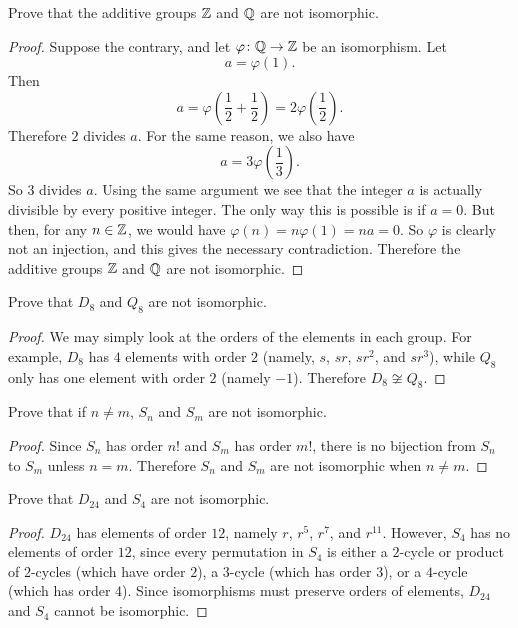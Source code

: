  Prove that the additive groups $\mathbb{Z}$ and $\mathbb{Q}$ are not
isomorphic.
\begin{proof}
  Suppose the contrary, and let $\varphi\colon\mathbb{Q}\to\mathbb{Z}$ be an
  isomorphism. Let
  \begin{equation*}
    a = \varphi(1).
  \end{equation*}
  Then
  \begin{equation*}
    a = \varphi\left(\frac12 + \frac12\right)
    = 2\varphi\left(\frac12\right).
  \end{equation*}
  Therefore $2$ divides $a$. For the same reason, we also have
  \begin{equation*}
    a = 3\varphi\left(\frac13\right).
  \end{equation*}
  So $3$ divides $a$. Using the same argument we see that the integer
  $a$ is actually divisible by every positive integer. The only way
  this is possible is if $a = 0$. But then, for any $n\in\mathbb{Z}$, we would
  have $\varphi(n) = n\varphi(1) = na = 0$. So $\varphi$ is clearly
  not an injection, and this gives the necessary
  contradiction. Therefore the additive groups $\mathbb{Z}$ and $\mathbb{Q}$ are not
  isomorphic.
\end{proof}

 Prove that $D_8$ and $Q_8$ are not isomorphic.
\begin{proof}
  We may simply look at the orders of the elements in each group. For
  example, $D_8$ has $4$ elements with order $2$ (namely, $s$, $sr$,
  $sr^2$, and $sr^3$), while $Q_8$ only has one element with order $2$
  (namely $-1$). Therefore $D_8\not\cong Q_8$.
\end{proof}

 Prove that if $n\neq m$, $S_n$ and $S_m$ are not
isomorphic.
\begin{proof}
  Since $S_n$ has order $n!$ and $S_m$ has order $m!$, there is no
  bijection from $S_n$ to $S_m$ unless $n = m$. Therefore $S_n$ and
  $S_m$ are not isomorphic when $n\neq m$.
\end{proof}

 Prove that $D_{24}$ and $S_4$ are not isomorphic.
\begin{proof}
  $D_{24}$ has elements of order $12$, namely $r$, $r^5$, $r^7$, and
  $r^{11}$. However, $S_4$ has no elements of order $12$, since every
  permutation in $S_4$ is either a $2$-cycle or product of $2$-cycles
  (which have order $2$), a $3$-cycle (which has order $3$), or a
  $4$-cycle (which has order $4$). Since isomorphisms must preserve
  orders of elements, $D_{24}$ and $S_4$ cannot be isomorphic.
\end{proof}

